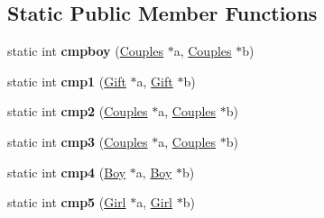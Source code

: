\subsection*{Static Public Member Functions}
\begin{DoxyCompactItemize}
\item 
\hypertarget{class_sorting_aa95ba103b969258daad6fcc9eb9fc421}{static int {\bfseries cmpboy} (\hyperlink{class_couples}{Couples} $\ast$a, \hyperlink{class_couples}{Couples} $\ast$b)}\label{class_sorting_aa95ba103b969258daad6fcc9eb9fc421}

\item 
\hypertarget{class_sorting_aa3f0edd22b4d4361203689462ec027d6}{static int {\bfseries cmp1} (\hyperlink{class_gift}{Gift} $\ast$a, \hyperlink{class_gift}{Gift} $\ast$b)}\label{class_sorting_aa3f0edd22b4d4361203689462ec027d6}

\item 
\hypertarget{class_sorting_add7199d4fc3e0e01ed80d140e8568bff}{static int {\bfseries cmp2} (\hyperlink{class_couples}{Couples} $\ast$a, \hyperlink{class_couples}{Couples} $\ast$b)}\label{class_sorting_add7199d4fc3e0e01ed80d140e8568bff}

\item 
\hypertarget{class_sorting_af4b9994c05b216096bac2268783b4c60}{static int {\bfseries cmp3} (\hyperlink{class_couples}{Couples} $\ast$a, \hyperlink{class_couples}{Couples} $\ast$b)}\label{class_sorting_af4b9994c05b216096bac2268783b4c60}

\item 
\hypertarget{class_sorting_a8e9df4f25125fa9b87df31f78999cdf1}{static int {\bfseries cmp4} (\hyperlink{class_boy}{Boy} $\ast$a, \hyperlink{class_boy}{Boy} $\ast$b)}\label{class_sorting_a8e9df4f25125fa9b87df31f78999cdf1}

\item 
\hypertarget{class_sorting_ad0e0fa341376a88e91187edd01ad009c}{static int {\bfseries cmp5} (\hyperlink{class_girl}{Girl} $\ast$a, \hyperlink{class_girl}{Girl} $\ast$b)}\label{class_sorting_ad0e0fa341376a88e91187edd01ad009c}

\end{DoxyCompactItemize}


